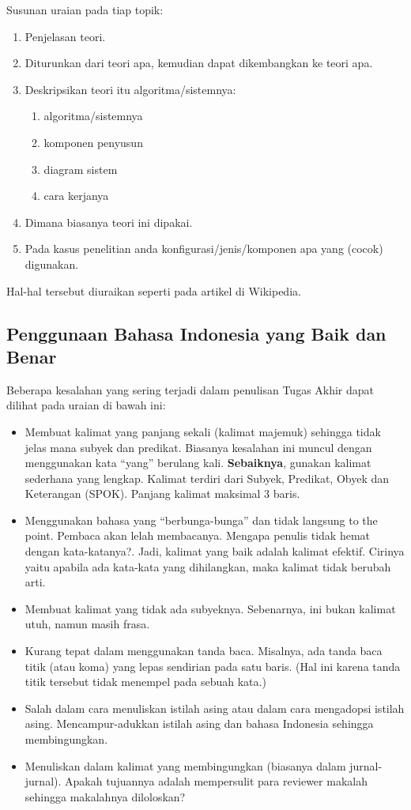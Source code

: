 \documentclass{final_project}
\begin{document}
Susunan uraian pada tiap topik:
\begin{enumerate}
    \item Penjelasan teori.
    \item Diturunkan dari teori apa, kemudian dapat dikembangkan ke teori apa.
    \item Deskripsikan teori itu algoritma/sistemnya:
    \begin{enumerate}
        \item algoritma/sistemnya 
        \item komponen penyusun
        \item diagram sistem
        \item cara kerjanya
    \end{enumerate}
    \item Dimana biasanya teori ini dipakai.
    \item Pada kasus penelitian anda konfigurasi/jenis/komponen apa yang (cocok) digunakan.
\end{enumerate}

Hal-hal tersebut diuraikan seperti pada artikel di Wikipedia.
    
\subsection{Penggunaan Bahasa Indonesia yang Baik dan Benar}

Beberapa kesalahan yang sering terjadi dalam penulisan Tugas Akhir dapat dilihat pada uraian di bawah ini:
\begin{itemize}
    \item Membuat kalimat yang panjang sekali (kalimat majemuk) sehingga tidak jelas mana subyek dan predikat. Biasanya kesalahan ini muncul dengan menggunakan kata “yang” berulang kali. \textbf{Sebaiknya}, gunakan kalimat sederhana yang lengkap. Kalimat terdiri dari Subyek, Predikat, Obyek dan Keterangan (SPOK). Panjang kalimat maksimal 3 baris.
    \item Menggunakan bahasa yang “berbunga-bunga” dan tidak langsung to the point. Pembaca akan lelah membacanya. Mengapa penulis tidak hemat dengan kata-katanya?. Jadi, kalimat yang baik adalah kalimat efektif. Cirinya yaitu apabila ada kata-kata yang dihilangkan, maka kalimat tidak berubah arti. 
    \item Membuat kalimat yang tidak ada subyeknya. Sebenarnya, ini bukan kalimat utuh, namun masih frasa.
    \item Kurang tepat dalam menggunakan tanda baca. Misalnya, ada tanda baca titik (atau koma) yang lepas sendirian pada satu baris. (Hal ini karena tanda titik tersebut tidak menempel pada sebuah kata.) 
    \item Salah dalam cara menuliskan istilah asing atau dalam cara mengadopsi istilah asing. Mencampur-adukkan istilah asing dan bahasa Indonesia sehingga membingungkan. 
    \item Menuliskan dalam kalimat yang membingungkan (biasanya dalam jurnal-jurnal). Apakah tujuannya adalah mempersulit para reviewer makalah sehingga makalahnya diloloskan? 
\end{itemize}
\end{document}
